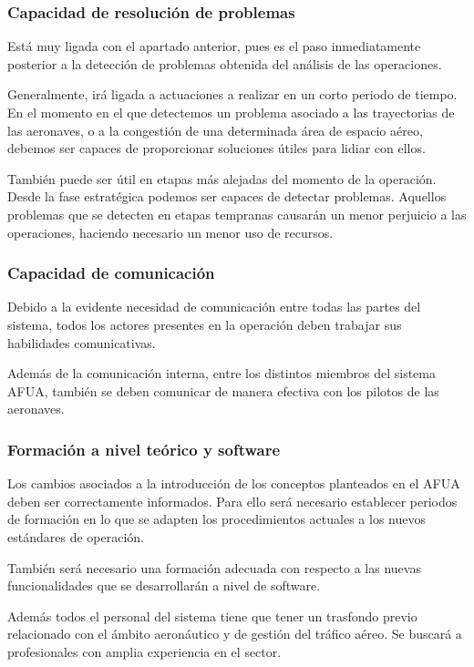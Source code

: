 \subsubsection{Capacidad de resolución de problemas}

Está muy ligada con el apartado anterior, pues es el paso inmediatamente posterior a la detección de problemas obtenida del análisis de las operaciones.

Generalmente, irá ligada a actuaciones a realizar en un corto periodo de tiempo. En el momento en el que detectemos un problema asociado a las trayectorias de las aeronaves, o a la congestión de una determinada área de espacio aéreo, debemos ser capaces de proporcionar soluciones útiles para lidiar con ellos.

También puede ser útil en etapas más alejadas del momento de la operación. Desde la fase estratégica podemos ser capaces de detectar problemas. Aquellos problemas que se detecten en etapas tempranas causarán un menor perjuicio a las operaciones, haciendo necesario un menor uso de recursos.

\subsubsection{Capacidad de comunicación}

Debido a la evidente necesidad de comunicación entre todas las partes del sistema, todos los actores presentes en la operación deben trabajar sus habilidades comunicativas. 

Además de la comunicación interna, entre los distintos miembros del sistema AFUA, también se deben comunicar de manera efectiva con los pilotos de las aeronaves.

\subsubsection{Formación a nivel teórico y software}

Los cambios asociados a la introducción de los conceptos planteados en el AFUA deben ser correctamente informados. Para ello será necesario establecer periodos de formación en lo que se adapten los procedimientos actuales a los nuevos estándares de operación.

También será necesario una formación adecuada con respecto a las nuevas funcionalidades que se desarrollarán a nivel de software.

Además todos el personal del sistema tiene que tener un trasfondo previo relacionado con el ámbito aeronáutico y de gestión del tráfico aéreo. Se buscará a profesionales con amplia experiencia en el sector.